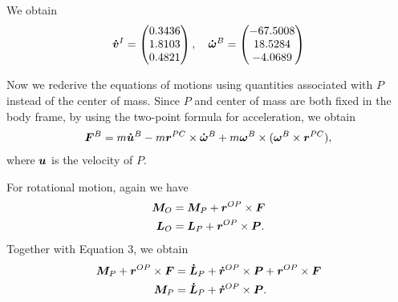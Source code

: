 \documentclass[12pt]{article}
\begin{document}
\begin{problem}[2]
We obtain
\begin{align*}
	{\bm{ \dot{v}}}^{I} = \begin{pmatrix} 0.3436\\1.8103\\0.4821 \end{pmatrix}  , \quad {\bm{ \dot{\omega}}}^{B} = \begin{pmatrix} -67.5008\\18.5284\\ -4.0689  \end{pmatrix}  
\end{align*}
\end{problem}

\begin{problem}[3]
Now we rederive the equations of motions using quantities associated with $ P$ instead of the center of mass. Since $ P$ and center of mass are both fixed in the body frame, by using the two-point formula for acceleration, we obtain
\begin{align}
	{\bm{ F}}^{B} = m {\bm{ \dot{u}}}^{B} - m {\bm{ r}}^{PC} \times {\bm{ \dot{\omega}}}^{B} + m {\bm{ \omega}}^{B}\times ( {\bm{ \omega}}^{B}  \times {\bm{ r}}^{PC} ) ,
\end{align}
where $ {\bm{ u}} $ is the velocity of $ P$. 

For rotational motion, again we have
\begin{align}
	{\bm{M}}_O &= {\bm{ M}}_{P} + {\bm{ r}}^{OP} \times {\bm{ F}} \\
	{\bm{ L}}_O &= {\bm{ L}}_P + {\bm{ r}}^{OP} \times {\bm{ P}} .
\end{align}
Together with Equation 3, we obtain
\begin{align}
	{\bm{ M}}_P + {\bm{ r}}^{OP} \times {\bm{ F}}   &= {\bm{ \dot{L}}}_P + {\bm{ \dot{r}}}^{OP} \times {\bm{ P}}   + {\bm{ r}}^{OP} \times {\bm{ F}}  \\
		  {\bm{ M}}_P  &= {\bm{ \dot{L}}}_P + {\bm{ \dot{r}}}^{OP} \times {\bm{ P}}  .
\end{align}


\end{problem}
\end{document}
